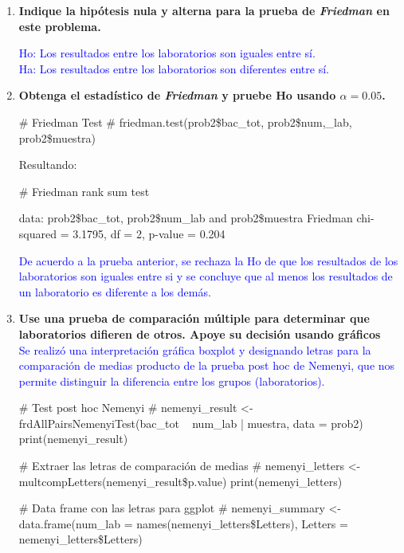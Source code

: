 \documentclass[a4paper,12pt]{article}
\begin{document}
\begin{enumerate} [label=\textbf{\alph*})]
\item {\textbf{Indique la hipótesis nula y alterna para la prueba de \textit{Friedman} en este problema.}}
	\begin{center}
		\textcolor{blue}{
			Ho: Los resultados entre los laboratorios son iguales entre sí.\\
			Ha: Los resultados entre los laboratorios son diferentes entre sí.}
	\end{center}
\item {\textbf{Obtenga el estadístico de \textit{Friedman} y pruebe Ho usando \(\alpha=0.05\).}}
	\begin{MyVerbatim}
# Friedman Test #
friedman.test(prob2\$bac\_tot, prob2\$num,\_lab, prob2\$muestra)
	\end{MyVerbatim}
Resultando:
\begin{MyVerbatim}
# Friedman rank sum test
	
data:  prob2\$bac\_tot, prob2\$num\_lab and prob2\$muestra
Friedman chi-squared = 3.1795, df = 2, p-value = 0.204
\end{MyVerbatim}
\textcolor{blue}{De acuerdo a la prueba anterior, se rechaza la Ho de que los resultados de los laboratorios son iguales entre si y se concluye que al menos los resultados de un laboratorio es diferente a los demás.}
\item {\textbf{Use una prueba de comparación múltiple para determinar que laboratorios difieren de otros. Apoye su decisión usando gráficos}}\\
\textcolor{blue}{Se realizó una interpretación gráfica boxplot y designando letras para la comparación de medias producto de la prueba post hoc de Nemenyi, que nos permite distinguir la diferencia entre los grupos (laboratorios).}
	\begin{MyVerbatim}
	# Test post hoc Nemenyi #
nemenyi\_result <- frdAllPairsNemenyiTest(bac\_tot ~ num\_lab | muestra, 
data = prob2)
print(nemenyi\_result)

	# Extraer las letras de comparación de medias #
nemenyi\_letters <- multcompLetters(nemenyi\_result\$p.value)
print(nemenyi\_letters)

	# Data frame con las letras para ggplot #
nemenyi\_summary <- data.frame(num\_lab = names(nemenyi\_letters\$Letters), 
Letters = nemenyi\_letters\$Letters)


\end{MyVerbatim}
\end{enumerate}
\end{document}
